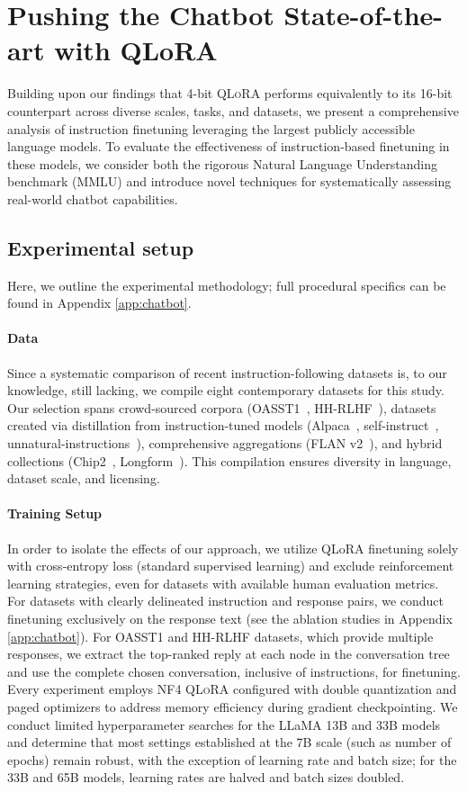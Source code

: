 \section{Pushing the Chatbot State-of-the-art with QLoRA}
\label{sec:pushing}
Building upon our findings that 4-bit \textsc{QLoRA} performs equivalently to its 16-bit counterpart across diverse scales, tasks, and datasets, we present a comprehensive analysis of instruction finetuning leveraging the largest publicly accessible language models. To evaluate the effectiveness of instruction-based finetuning in these models, we consider both the rigorous Natural Language Understanding benchmark (MMLU) and introduce novel techniques for systematically assessing real-world chatbot capabilities.

\subsection{Experimental setup} Here, we outline the experimental methodology; full procedural specifics can be found in Appendix \ref{app:chatbot}.

\paragraph{Data} Since a systematic comparison of recent instruction-following datasets is, to our knowledge, still lacking, we compile eight contemporary datasets for this study. Our selection spans crowd-sourced corpora (OASST1~\citep{kopf2023openassistant}, HH-RLHF~\citep{bai2022training}), datasets created via distillation from instruction-tuned models (Alpaca~\citep{alpaca}, self-instruct~\citep{wang2022self}, unnatural-instructions~\citep{honovich2022unnatural}), comprehensive aggregations (FLAN v2~\citep{chung2022scaling}), and hybrid collections (Chip2~\citep{laion2023}, Longform~\citep{koksal2023longform}). This compilation ensures diversity in language, dataset scale, and licensing.

\paragraph{Training Setup} In order to isolate the effects of our approach, we utilize QLoRA finetuning solely with cross-entropy loss (standard supervised learning) and exclude reinforcement learning strategies, even for datasets with available human evaluation metrics. For datasets with clearly delineated instruction and response pairs, we conduct finetuning exclusively on the response text (see the ablation studies in Appendix \ref{app:chatbot}). For OASST1 and HH-RLHF datasets, which provide multiple responses, we extract the top-ranked reply at each node in the conversation tree and use the complete chosen conversation, inclusive of instructions, for finetuning. Every experiment employs NF4 \textsc{QLoRA} configured with double quantization and paged optimizers to address memory efficiency during gradient checkpointing. We conduct limited hyperparameter searches for the LLaMA 13B and 33B models and determine that most settings established at the 7B scale (such as number of epochs) remain robust, with the exception of learning rate and batch size; for the 33B and 65B models, learning rates are halved and batch sizes doubled.

